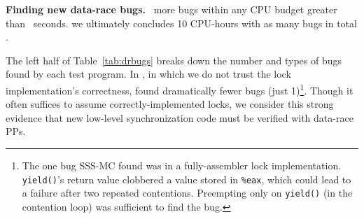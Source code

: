 {\bf Finding new data-race bugs.}
~more bugs within any CPU budget greater than ~seconds.
 we ultimately concludes 10 CPU-hours with  as many bugs in total .



The left half of Table~\ref{tab:drbugs}
breaks down the number and types of bugs found by each test program.
In \mxtest, in which we do not trust the lock implementation's correctness,
found dramatically fewer bugs (just 1)\footnote{
	The one bug SSS-MC found was in a fully-assembler lock implementation. {\tt yield()}'s return value clobbered a value stored in {\tt \%eax}, which could lead to a failure after two repeated contentions. Preempting only on {\tt yield()} (in the contention loop) was sufficient to find the bug.}.
Though it often suffices to assume correctly-implemented locks,
we consider this strong evidence that new low-level synchronization code must be verified with data-race PPs.

